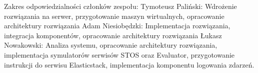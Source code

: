 \documentclass{szablonPG}
\begin{document}


\newpage
\thispagestyle{empty}
\mbox{}
\newpage



\tableofcontents








\printbibliography

\newpage
\thispagestyle{empty}
\noindent Zakres odpowiedzialności członków zespołu:
\newline Tymoteusz Paliński:
\newline Wdrożenie rozwiązania na serwer, przygotowanie maszyn wirtualnych, opracowanie architektury rozwiązania
\newline Adam Niesiobędzki: 
\newline Implementacja rozwiązania, integracja komponentów, opracowanie architektury rozwiązania
\newline Łukasz Nowakowski:
\newline Analiza systemu, opracowanie architektury rozwiązania, implementacja symulatorów serwisów STOS oraz Evaluator, przygotowanie instrukcji do serwisu Elasticstack, implementacja komponentu logowania zdarzeń.
\newpage
\end{document}
